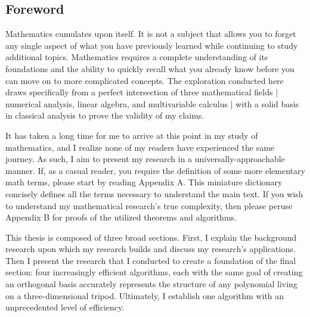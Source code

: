 \documentclass[letterpaper, 12pt]{article}
\begin{document}


\newpage
\begin{centering}
\tableofcontents %
\end{centering}







\newpage
\clearpage
\thispagestyle{empty}
\setcounter{page}{1}
\begin{centering}\section*{Foreword}\end{centering}

Mathematics cumulates upon itself. It is not a subject that allows you to forget any single aspect of what you have previously learned while continuing to study additional topics. Mathematics requires a complete understanding of its foundations and the ability to quickly recall what you already know before you can move on to more complicated concepts. The exploration conducted here draws specifically from a perfect intersection of three mathematical fields | numerical analysis, linear algebra, and multivariable calculus | with a solid basis in classical analysis to prove the validity of my claims.

It has taken a long time for me to arrive at this point in my study of mathematics, and I realize none of my readers have experienced the same journey. As such, I aim to present my research in a universally-approachable manner. If, as a casual reader, you require the definition of some more elementary math terms, please start by reading Appendix A. This miniature dictionary concisely defines all the terms necessary to understand the main text. If you wish to understand my mathematical research's true complexity, then please peruse Appendix B for proofs of the utilized theorems and algorithms.

This thesis is composed of three broad sections. First, I explain the background research upon which my research builds and discuss my research's applications. Then I present the research that I conducted to create a foundation of the final section: four increasingly efficient algorithms, each with the same goal of creating an orthogonal basis accurately represents the structure of any polynomial living on a three-dimensional tripod. Ultimately, I establish one algorithm with an unprecedented level of efficiency.
\end{document}
